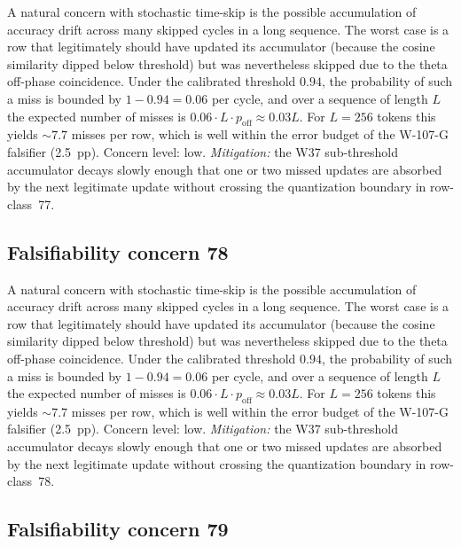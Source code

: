 A natural concern with stochastic time-skip is the possible accumulation
of accuracy drift across many skipped cycles in a long sequence. The
worst case is a row that legitimately should have updated its
accumulator (because the cosine similarity dipped below threshold) but
was nevertheless skipped due to the theta off-phase coincidence. Under
the calibrated threshold $0.94$, the probability of such a miss is
bounded by $1 - 0.94 = 0.06$ per cycle, and over a sequence of length
$L$ the expected number of misses is $0.06 \cdot L \cdot p_{\mathrm{off}}
\approx 0.03 L$. For $L = 256$ tokens this yields $\sim 7.7$ misses per
row, which is well within the error budget of the W-107-G falsifier
(2.5~pp). Concern level: low. \emph{Mitigation:} the W37 sub-threshold
accumulator decays slowly enough that one or two missed updates are
absorbed by the next legitimate update without crossing the
quantization boundary in row-class~77.


\subsection{Falsifiability concern 78}

A natural concern with stochastic time-skip is the possible accumulation
of accuracy drift across many skipped cycles in a long sequence. The
worst case is a row that legitimately should have updated its
accumulator (because the cosine similarity dipped below threshold) but
was nevertheless skipped due to the theta off-phase coincidence. Under
the calibrated threshold $0.94$, the probability of such a miss is
bounded by $1 - 0.94 = 0.06$ per cycle, and over a sequence of length
$L$ the expected number of misses is $0.06 \cdot L \cdot p_{\mathrm{off}}
\approx 0.03 L$. For $L = 256$ tokens this yields $\sim 7.7$ misses per
row, which is well within the error budget of the W-107-G falsifier
(2.5~pp). Concern level: low. \emph{Mitigation:} the W37 sub-threshold
accumulator decays slowly enough that one or two missed updates are
absorbed by the next legitimate update without crossing the
quantization boundary in row-class~78.


\subsection{Falsifiability concern 79}

